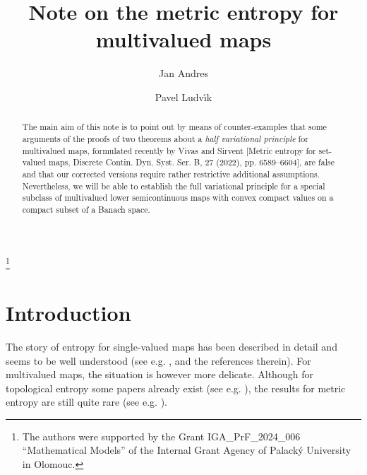 \documentclass[12pt]{amsart}
\theoremstyle{definition}
\begin{document}
%


\begin{abstract}
The main aim of this note is to point out by means of counter-examples that some arguments of the proofs of two theorems about a \emph{half variational principle} for multivalued maps, formulated recently by Vivas and Sirvent [Metric entropy for set-valued maps, Discrete Contin.
Dyn. Syst. Ser. B, 27 (2022), pp. 6589–6604], are false and that our corrected versions require rather restrictive additional assumptions. Nevertheless, we will be able to establish the full variational principle for a special subclass of multivalued lower semicontinuous maps with convex compact values on a compact subset of a Banach space.
\end{abstract}


\thanks{The authors were supported by the Grant IGA\_PrF\_2024\_006 ``Mathematical Models'' of the Internal Grant Agency of Palack\'y University in Olomouc.}


\title[Note on the metric entropy for multivalued maps]{Note on the metric entropy for multivalued maps}


\author[J. Andres]{Jan Andres}
\address{Department of Mathematical Analysis and Applications of Mathematics, Faculty of Science, Palack\'y University, 17. listopadu 12, 771 46 Olomouc, Czech Republic}
\author[P. Ludv\'\i k]{Pavel Ludv\'\i k}

\maketitle

\section{Introduction}
The story of entropy for single-valued maps has been described in detail and seems to be well understood (see e.g. \cite{Ba1,Ba, Ba2,Do, FN, Ka}, and the references therein). For multivalued maps, the situation is however more delicate. Although for topological entropy some papers already exist (see e.g. \cite{AK,An,AL1,AL2,AL3,CMM1,CP,EK,KT,RT,WZZ}), the results for metric entropy are still quite rare (see e.g. \cite{CMM2,LLZ,VS}).
\end{document}
